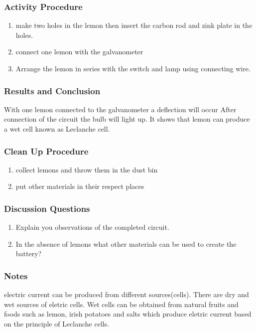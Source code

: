 \subsubsection*{Activity Procedure}
\begin{enumerate}
\item{make two holes in the lemon then insert the carbon rod and zink plate in the holes.} 
\item{connect one lemon with the galvanometer}
\item{Arrange the lemon in series with the switch and lamp using connecting wire.} 
\end{enumerate}

\subsubsection*{Results and Conclusion}
With one lemon connected to the galvanometer a deflection will occur 
After connection of the circuit the bulb will light up. It shows that lemon can produce a wet cell known as Leclanche cell.  

\subsubsection*{Clean Up Procedure}
\begin{enumerate}
\item{collect lemons and throw them in the dust bin}
\item{put other materials in their respect places}
\end{enumerate}

\subsubsection*{Discussion Questions}
\begin{enumerate}
\item{Explain you observations of the completed circuit.}
\item{In the absence of lemons what other materials can be used to create the battery?} 
\end{enumerate}

\subsubsection*{Notes}
electric current can be produced from different sources(cells). There are dry and wet sources of eletric cells. Wet cells can be obtained from natural fruits and foods such as lemon, irish potatoes and salts which produce eletric current based on the principle of Leclanche cells.  


